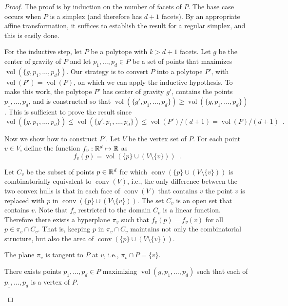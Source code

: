 \documentclass[lotsofwhite]{patmorin}
\DeclareMathOperator{\vol}{vol}
\DeclareMathOperator{\conv}{conv}
\begin{document}
\begin{proof}
The proof is by induction on the number of facets of $P$.  The base
case occurs when $P$ is a simplex (and therefore has $d+1$ facets).
By an appropriate affine transformation, it suffices to establish the
result for a regular simplex, and this is easily done.

For the inductive step, let $P$ be a polytope with $k > d+1$ facets.
Let $g$ be the center of gravity of $P$ and let $p_1,\ldots,p_d\in P$
be a set of points that maximizes $\vol(\{g,p_1,\ldots,p_d\})$.   Our
strategy is to convert $P$ into a polytope $P'$, with
$\vol(P')=\vol(P)$, on which we can apply the inductive hypothesis.
To make this work, the polytope $P'$ has center of gravity $g'$,
contains the points $p_1,\ldots,p_d$, and is constructed so that
$\vol(\{g',p_1,\ldots,p_d\}) \ge \vol(\{g,p_1,\ldots,p_d\})$.  This is
sufficient to prove the result since
\[
   \vol(\{g,p_1,\ldots,p_d\}) \le \vol(\{g',p_1,\ldots,p_d\}) \le 
        \vol(P')/(d+1) = \vol(P)/(d+1) \enspace .
\]

Now we show how to construct $P'$.  Let $V$ be the vertex set of $P$.
For each point $v\in V$, define the function $f_v:\mathbb{R}^d\mapsto\mathbb{R}$ as 
\[ 
   f_v(p)=\vol(\{p\}\cup (V\setminus\{v\})) \enspace .
\]

Let $C_v$ be the subset of points $p\in \mathbb{R}^d$ for which
$\conv(\{p\}\cup (V\setminus\{v\}))$ is combinatorially equivalent to
$\conv(V)$, i.e., the only difference between the two convex hulls is
that in each face of $\conv(V)$ that contains $v$ the point $v$ is
replaced with $p$ in $\conv(\{p\}\cup(V\setminus \{v\}))$.  The set
$C_v$ is an open set that contains $v$.  Note that $f_v$
restricted to the domain 
$C_v$ is a linear function.  Therefore there exists a hyperplane
$\pi_v$ such that $f_v(p)=f_v(v)$ for all $p\in \pi_v\cap C_v$. That
is, keeping $p$ in $\pi_v\cap C_v$ maintains not only the
combinatorial structure, but also the area of
$\conv(\{p\}\cup(V\setminus\{v\}))$. 

\begin{clm}
The plane $\pi_v$ is tangent to $P$ at $v$, i.e., $\pi_v\cap P=\{v\}$.
\end{clm} 

\begin{clm}
There exists points $p_1,\ldots,p_d\in P$ maximizing
$\vol(g,p_1,\ldots,p_d)$ such that each of $p_1,\ldots,p_d$ is a vertex of
$P$.
\end{clm}


\end{proof}
\end{document}
